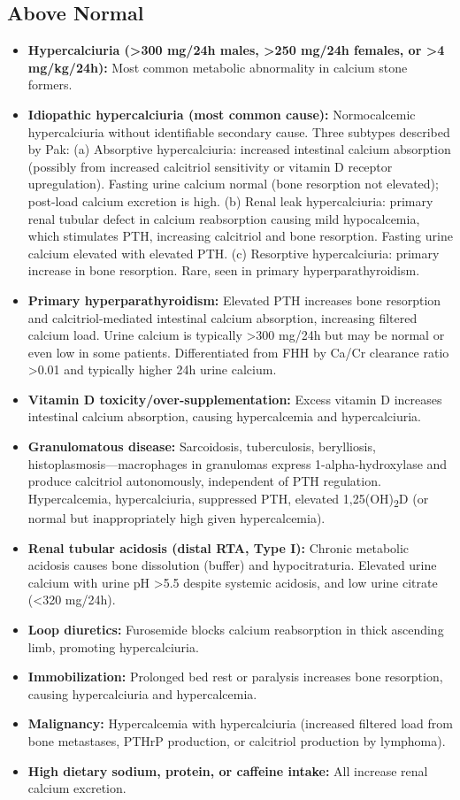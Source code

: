\subsection*{Above Normal}
\begin{itemize}
  \item \textbf{Hypercalciuria (>300 mg/24h males, >250 mg/24h females, or >4 mg/kg/24h):} Most common metabolic abnormality in calcium stone formers.
  \item \textbf{Idiopathic hypercalciuria (most common cause):} Normocalcemic hypercalciuria without identifiable secondary cause. Three subtypes described by Pak: (a) Absorptive hypercalciuria: increased intestinal calcium absorption (possibly from increased calcitriol sensitivity or vitamin D receptor upregulation). Fasting urine calcium normal (bone resorption not elevated); post-load calcium excretion is high. (b) Renal leak hypercalciuria: primary renal tubular defect in calcium reabsorption causing mild hypocalcemia, which stimulates PTH, increasing calcitriol and bone resorption. Fasting urine calcium elevated with elevated PTH. (c) Resorptive hypercalciuria: primary increase in bone resorption. Rare, seen in primary hyperparathyroidism.
  \item \textbf{Primary hyperparathyroidism:} Elevated PTH increases bone resorption and calcitriol-mediated intestinal calcium absorption, increasing filtered calcium load. Urine calcium is typically >300 mg/24h but may be normal or even low in some patients. Differentiated from FHH by Ca/Cr clearance ratio >0.01 and typically higher 24h urine calcium.
  \item \textbf{Vitamin D toxicity/over-supplementation:} Excess vitamin D increases intestinal calcium absorption, causing hypercalcemia and hypercalciuria.
  \item \textbf{Granulomatous disease:} Sarcoidosis, tuberculosis, berylliosis, histoplasmosis---macrophages in granulomas express 1-alpha-hydroxylase and produce calcitriol autonomously, independent of PTH regulation. Hypercalcemia, hypercalciuria, suppressed PTH, elevated 1,25(OH)\textsubscript{2}D (or normal but inappropriately high given hypercalcemia).
  \item \textbf{Renal tubular acidosis (distal RTA, Type I):} Chronic metabolic acidosis causes bone dissolution (buffer) and hypocitraturia. Elevated urine calcium with urine pH >5.5 despite systemic acidosis, and low urine citrate (<320 mg/24h).
  \item \textbf{Loop diuretics:} Furosemide blocks calcium reabsorption in thick ascending limb, promoting hypercalciuria.
  \item \textbf{Immobilization:} Prolonged bed rest or paralysis increases bone resorption, causing hypercalciuria and hypercalcemia.
  \item \textbf{Malignancy:} Hypercalcemia with hypercalciuria (increased filtered load from bone metastases, PTHrP production, or calcitriol production by lymphoma).
  \item \textbf{High dietary sodium, protein, or caffeine intake:} All increase renal calcium excretion.
\end{itemize}

